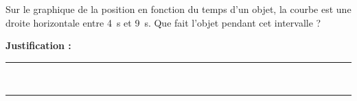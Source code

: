 Sur le graphique de la position en fonction du temps d'un objet, la courbe est une droite horizontale entre \qty{4}{s} et \qty{9}{s}. Que fait l'objet pendant cet intervalle ?

\choices

\noindent\textbf{Justification :} \hrulefill \\[2.5ex]
\rule{\linewidth}{0.4pt} \\[2.5ex]
\rule{\linewidth}{0.4pt}
\vfill
